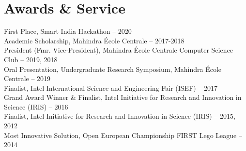 \documentclass[a4paper,11pt]{article}
\begin{document}
{{%
\section{Awards \& Service}
    {\small
    \begin{adjustwidth}{10pt}{}
        First Place, Smart India Hackathon -- 2020 \\
        Academic Scholarship, Mahindra \'{E}cole Centrale -- 2017-2018 \\
        President (Fmr. Vice-President), Mahindra \'{E}cole Centrale Computer Science Club -- 2019, 2018 \\
        Oral Presentation, Undergraduate Research Symposium, Mahindra \'{E}cole Centrale -- 2019 \\
        Finalist, Intel International Science and Engineering Fair (ISEF) -- 2017 \\
        Grand Award Winner \& Finalist, Intel Initiative for Research and Innovation in Science (IRIS) -- 2016 \\
        Finalist, Intel Initiative for Research and Innovation in Science (IRIS) -- 2015, 2012 \\
        Most Innovative Solution, Open European Championship FIRST Lego League -- 2014
    \end{adjustwidth}
    }

}}
\end{document}
